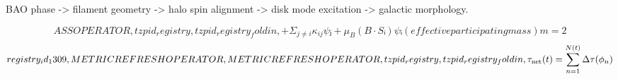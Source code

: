 
\begin{tzpsnapshot}
\end{tzpsnapshot}

BAO phase -> filament geometry -> halo spin alignment -> disk mode excitation -> galactic morphology.

\[
ASS OPERATOR,tzpid_registry,tzpid_registry_foldin,+ Σ_{j ≠ i} κ_{ij} ψⱼ + μ_B (B·Sᵢ) ψᵢ (effective participating mass) m = 2
\]
\[
registry_id_1309,METRIC REFRESH OPERATOR,METRIC REFRESH OPERATOR,tzpid_registry,tzpid_registry_foldin,\tau_{\rm net}(t) = \sum_{n=1}^{N(t)} \Delta \tau(\phi_n)
\]

